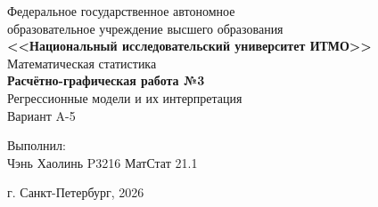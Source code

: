 \begin{titlepage}
    \centering
    Федеральное государственное автономное \\
    образовательное учреждение высшего образования \\
    \textbf{<<Национальный исследовательский университет ИТМО>>} \\

    \vfill
    Математическая статистика \\
    \vspace{0.5\baselineskip}
    \textbf{Расчётно-графическая работа №3} \\
    \vspace{0.5\baselineskip}
    Регрессионные модели и их интерпретация \\
    \vspace{0.5\baselineskip}
    Вариант A-5 \\

    \vfill

    \flushright
    Выполнил:\\
    Чэнь Хаолинь P3216 МатСтат 21.1\\

    \vspace{4\baselineskip}

    \centering
    г. Санкт-Петербург, 2026

\end{titlepage}
